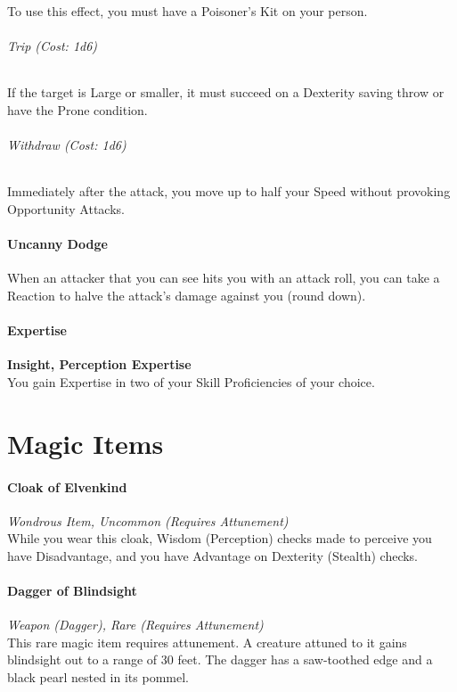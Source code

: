 \documentclass[letterpaper,openany,oneside,twocolumn]{book}
\begin{document}
To use this effect, you must have a Poisoner's Kit on your person.

\paragraph*{Trip (Cost: 1d6)} If the target is Large or smaller, it must succeed on a Dexterity saving throw or have the Prone condition.

\paragraph*{Withdraw (Cost: 1d6)} Immediately after the attack, you move up to half your Speed without provoking Opportunity Attacks.
\subsection*{Uncanny Dodge}
When an attacker that you can see hits you with an attack roll, you can take a Reaction to halve the attack's damage against you (round down).
\subsection*{Expertise}
\textbf{Insight, Perception Expertise}\\
You gain Expertise in two of your Skill Proficiencies of your choice.

\part*{Magic Items}
\subsection*{Cloak of Elvenkind}
\textit{Wondrous Item, Uncommon (Requires Attunement)}\\
{\entryfont While you wear this cloak, Wisdom (Perception) checks made to perceive you have Disadvantage, and you have Advantage on Dexterity (Stealth) checks.}
\subsection*{Dagger of Blindsight}
\textit{Weapon (Dagger), Rare (Requires Attunement)}\\
{\entryfont This rare magic item requires attunement. A creature attuned to it gains blindsight out to a range of 30 feet. The dagger has a saw-toothed edge and a black pearl nested in its pommel.}
\end{document}
